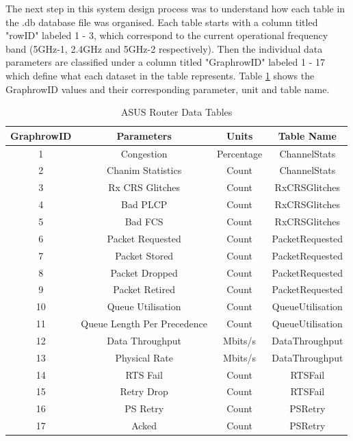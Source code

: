 The next step in this system design process was to understand how each table in the .db database file was organised. Each table starts with a column titled "rowID" labeled 1 - 3, which correspond to the current operational frequency band (5GHz-1, 2.4GHz and 5GHz-2 respectively). Then the individual data parameters are classified under a column titled "GraphrowID" labeled 1 - 17 which define what each dataset in the table represents. Table \ref{table:GUIData} shows the GraphrowID values and their corresponding parameter, unit and table name. 

\begin{table}[ht]
\centering
\begin{center}
\begin{tabular}{ |c|c|c|c| } 
  \hline
 \textbf{GraphrowID} & \textbf{Parameters} & \textbf{Units} & \textbf{Table Name}\\ 
  \hline\hline
 1 & Congestion & Percentage & ChannelStats \\ 
 2 & Chanim Statistics & Count & ChannelStats \\ 
 3 & Rx CRS Glitches & Count & RxCRSGlitches\\ 
 4 & Bad PLCP & Count & RxCRSGlitches\\ 
 5 & Bad FCS & Count & RxCRSGlitches\\ 
 6 & Packet Requested  & Count & PacketRequested\\ 
 7 & Packet Stored &Count & PacketRequested\\ 
 8 & Packet Dropped  & Count & PacketRequested\\
 9 & Packet Retired & Count & PacketRequested\\ 
 10 & Queue Utilisation & Count & QueueUtilisation\\ 
 11 & Queue Length Per Precedence & Count & QueueUtilisation\\ 
 12 & Data Throughput & Mbits/s & DataThroughput\\ 
 13 & Physical Rate  & Mbits/s & DataThroughput\\ 
 14 & RTS Fail & Count & RTSFail\\ 
 15 & Retry Drop & Count & RTSFail\\  
 16 & PS Retry & Count & PSRetry\\ 
 17 & Acked & Count & PSRetry\\ 
 \hline
\end{tabular}
\caption{ASUS Router Data Tables}
\label{table:GUIData}
\end{center}
\end{table}

